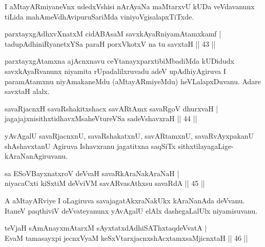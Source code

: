 \begin{artha}
I aMtayARmiyaneVnx udedxVshisi nArAyaNa maMtarxvU kUDa veVdavanunx tiLida mahAmeVdhAvipuruSariMda viniyoVgisalapxTiTxde.
\end{artha}

\begin{shl}
parxtayxgAdhxvXnatxM cidABAsaM savxkAyaRniyamAtamxkamf |\\
tadupAdhiniRyanetxYSa paraH porxVkotxV na tu savxtaH \hfill || 43 ||
\end{shl}

\begin{artha}%
parxtayxgAtamxna ajAcnxnavu ceYtanayxparxtibiMbadiMda kUDidudx savxkAyaRvanunx niyamita rUpadalilxruvadu adeV upAdhiyAgiruva I paramAtamxnu niyAmakaneMdu (aMtayARmiyeMdu) heVLalapxDuvanu. Adare savxtaH alalx.
\end{artha}

\begin{shl}
savaRjacnxH savaRshakitxshacx savARtAmx savaRgoV dhurxvaH |\\
jagajajxnisithxtidhavxMsaheVtureVSa sadeVshavxraH \hfill || 44 ||
\end{shl}

\begin{artha}
yAvAgalU savaRjacnxnU, savaRshakatxnU, savARtamxnU, savaRvAyxpakanU shAshavxtanU Agiruva Ishavxranu jagatitxna saqSiTx sithxtilayagaLige-kAraNanAgiruvanu.
\end{artha}


\begin{shl}
sa ESoV\s BayxnatxroV deVvaH savaRkAraNakAraNaH |\\
niyacaCxti kiSxtiM deVviVM savARvasAthxsu savaRdA \hfill || 45 ||
\end{shl}

\begin{artha}
A aMtayARviye I oLagiruva savajagatAkxraNakUkx kAraNanAda deVvanu. ItaneV paqthiviV deVvateyanunx yAvAgalU elAlx dashegaLalUlx niyamisuvanu.
\end{artha}


\begin{shl}
teVjaH sAmAnayxmAtarxM sAyxtatxdAdhiSAThxtaqdeVvatA |\\
EvaM tamasayxpi jecnxVyaM keSxVtarxjacnxshAcx\s \s tamxsaMjicnxtaH \hfill || 46 ||
\end{shl}


